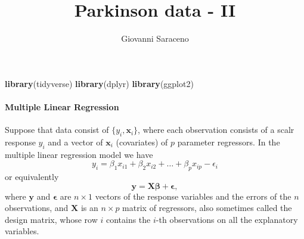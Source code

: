 \documentclass[
]{article}
\title{Parkinson data - II}
\author{Giovanni Saraceno}
\date{}
\newenvironment{Shaded}{\begin{snugshade}}{\end{snugshade}}
\newcommand{\AttributeTok}[1]{\textcolor[rgb]{0.13,0.29,0.53}{#1}}
\newcommand{\ConstantTok}[1]{\textcolor[rgb]{0.56,0.35,0.01}{#1}}
\newcommand{\DecValTok}[1]{\textcolor[rgb]{0.00,0.00,0.81}{#1}}
\newcommand{\FunctionTok}[1]{\textcolor[rgb]{0.13,0.29,0.53}{\textbf{#1}}}
\newcommand{\NormalTok}[1]{#1}
\newcommand{\OtherTok}[1]{\textcolor[rgb]{0.56,0.35,0.01}{#1}}
\newcommand{\SpecialCharTok}[1]{\textcolor[rgb]{0.81,0.36,0.00}{\textbf{#1}}}
\newcommand{\StringTok}[1]{\textcolor[rgb]{0.31,0.60,0.02}{#1}}
\begin{document}
\maketitle

{
\setcounter{tocdepth}{2}
\tableofcontents
}
\begin{Shaded}
\begin{Highlighting}[]
\FunctionTok{library}\NormalTok{(tidyverse)}
\FunctionTok{library}\NormalTok{(dplyr)}
\FunctionTok{library}\NormalTok{(ggplot2)}
\end{Highlighting}
\end{Shaded}

\begin{Shaded}
\end{Shaded}

\hypertarget{multiple-linear-regression}{%
\paragraph{Multiple Linear
Regression}\label{multiple-linear-regression}}

Suppose that data consist of \(\{y_i, \mathbf{x}_i\}\), where each
observation consists of a scalr response \(y_i\) and a vector of
\(\mathbf{x}_i\) (covariates) of \(p\) parameter regressors. In the
multiple linear regression model we have
\[y_i = \beta_1 x_{i1} + \beta_2 x_{i2} + \ldots + \beta_p x_{ip} - \epsilon_i\]
or equivalently
\[\mathbf{y} = \mathbf{X} \mathbf{\beta} + \mathbf{\epsilon},\] where
\(\mathbf{y}\) and \(\mathbf{\epsilon}\) are \(n \times 1\) vectors of
the response variables and the errors of the \(n\) observations, and
\(\mathbf{X}\) is an \(n \times p\) matrix of regressors, also sometimes
called the design matrix, whose row \(i\) contains the \(i\)-th
observations on all the explanatory variables.
\end{document}
